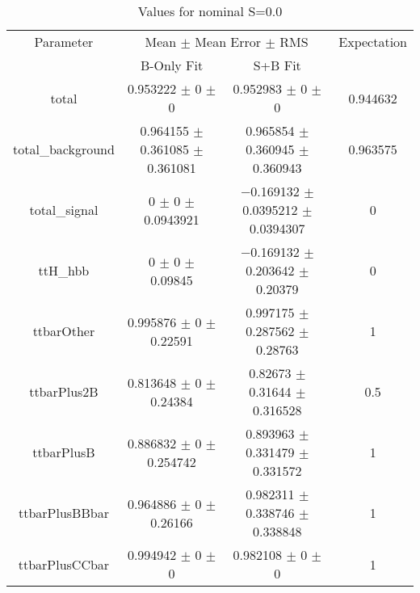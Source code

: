 \begin{table}
\centering
\caption{Values for nominal S=0.0}
\begin{tabular}{cccc}
\toprule
Parameter & \multicolumn{2}{c}{Mean $\pm$ Mean Error $\pm$ RMS} & Expectation\\
 & B-Only Fit & S+B Fit & \\
\midrule
total & \num{0.953222} $\pm$ \num{0} $\pm$ \num{0} & \num{0.952983} $\pm$ \num{0} $\pm$ \num{0} & \num{0.944632}\\
total\_background & \num{0.964155} $\pm$ \num{0.361085} $\pm$ \num{0.361081} & \num{0.965854} $\pm$ \num{0.360945} $\pm$ \num{0.360943} & \num{0.963575}\\
total\_signal & \num{0} $\pm$ \num{0} $\pm$ \num{0.0943921} & \num{-0.169132} $\pm$ \num{0.0395212} $\pm$ \num{0.0394307} & \num{0}\\
ttH\_hbb & \num{0} $\pm$ \num{0} $\pm$ \num{0.09845} & \num{-0.169132} $\pm$ \num{0.203642} $\pm$ \num{0.20379} & \num{0}\\
ttbarOther & \num{0.995876} $\pm$ \num{0} $\pm$ \num{0.22591} & \num{0.997175} $\pm$ \num{0.287562} $\pm$ \num{0.28763} & \num{1}\\
ttbarPlus2B & \num{0.813648} $\pm$ \num{0} $\pm$ \num{0.24384} & \num{0.82673} $\pm$ \num{0.31644} $\pm$ \num{0.316528} & \num{0.5}\\
ttbarPlusB & \num{0.886832} $\pm$ \num{0} $\pm$ \num{0.254742} & \num{0.893963} $\pm$ \num{0.331479} $\pm$ \num{0.331572} & \num{1}\\
ttbarPlusBBbar & \num{0.964886} $\pm$ \num{0} $\pm$ \num{0.26166} & \num{0.982311} $\pm$ \num{0.338746} $\pm$ \num{0.338848} & \num{1}\\
ttbarPlusCCbar & \num{0.994942} $\pm$ \num{0} $\pm$ \num{0} & \num{0.982108} $\pm$ \num{0} $\pm$ \num{0} & \num{1}\\
\bottomrule
\end{tabular}
\end{table}